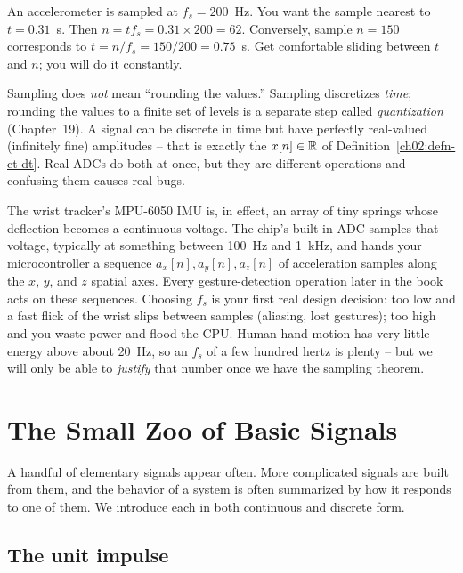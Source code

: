 \begin{example}
\label{ch02:ex-index}
An accelerometer is sampled at $f_s = 200$~Hz. You want the sample nearest to
$t = 0.31$~s. Then $n = t f_s = 0.31 \times 200 = 62$. Conversely, sample
$n = 150$ corresponds to $t = n/f_s = 150/200 = 0.75$~s. Get comfortable sliding
between $t$ and $n$; you will do it constantly.
\end{example}

\begin{trapbox}
Sampling does \emph{not} mean ``rounding the values.'' Sampling discretizes
\emph{time}; rounding the values to a finite set of levels is a separate step
called \emph{quantization} (Chapter~19). A signal can be discrete in time but
have perfectly real-valued (infinitely fine) amplitudes -- that is exactly the
$x[n] \in \mathbb{R}$ of Definition~\ref{ch02:defn-ct-dt}. Real ADCs do both at once, but
they are different operations and confusing them causes real bugs.
\end{trapbox}

\begin{goalbox}
The wrist tracker's MPU-6050 IMU is, in effect, an array of tiny springs whose
deflection becomes a continuous voltage. The chip's built-in ADC samples that
voltage, typically at something between 100~Hz and 1~kHz, and hands your
microcontroller a sequence $a_x[n], a_y[n], a_z[n]$ of acceleration samples along the $x$, $y$, and $z$ spatial axes. Every
gesture-detection operation later in the book acts on these sequences. Choosing
$f_s$ is your first real design decision: too low and a fast flick of the wrist
slips between samples (aliasing, lost gestures); too high and you waste power and
flood the CPU. Human hand motion has very little energy above about 20~Hz, so an
$f_s$ of a few hundred hertz is plenty -- but we will only be able to
\emph{justify} that number once we have the sampling theorem.
\end{goalbox}

\section{The Small Zoo of Basic Signals}
\label{ch02:zoo}

A handful of elementary signals appear often. More complicated signals are built from them, and
the behavior of a system is often summarized by how it responds to one
of them. We introduce each in both continuous and discrete form.

\subsection{The unit impulse}
\label{ch02:impulse}

